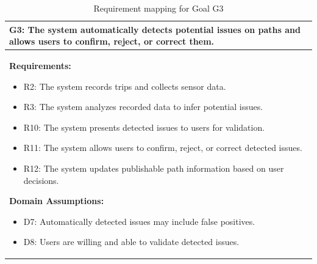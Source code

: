 \begin{table}[H]
\centering
\renewcommand{\arraystretch}{1.2}
\begin{tabular}{|p{}|}
\hline
\textbf{G3:} The system automatically detects potential issues on paths and
allows users to confirm, reject, or correct them. \\ \hline

\textbf{Requirements:}
\begin{itemize}
  \item R2: The system records trips and collects sensor data.
  \item R3: The system analyzes recorded data to infer potential issues.
  \item R10: The system presents detected issues to users for validation.
  \item R11: The system allows users to confirm, reject, or correct detected issues.
  \item R12: The system updates publishable path information based on user decisions.
\end{itemize}

\textbf{Domain Assumptions:}
\begin{itemize}
  \item D7: Automatically detected issues may include false positives.
  \item D8: Users are willing and able to validate detected issues.
\end{itemize}
\\ \hline
\end{tabular}
\caption{Requirement mapping for Goal G3}
\end{table}

